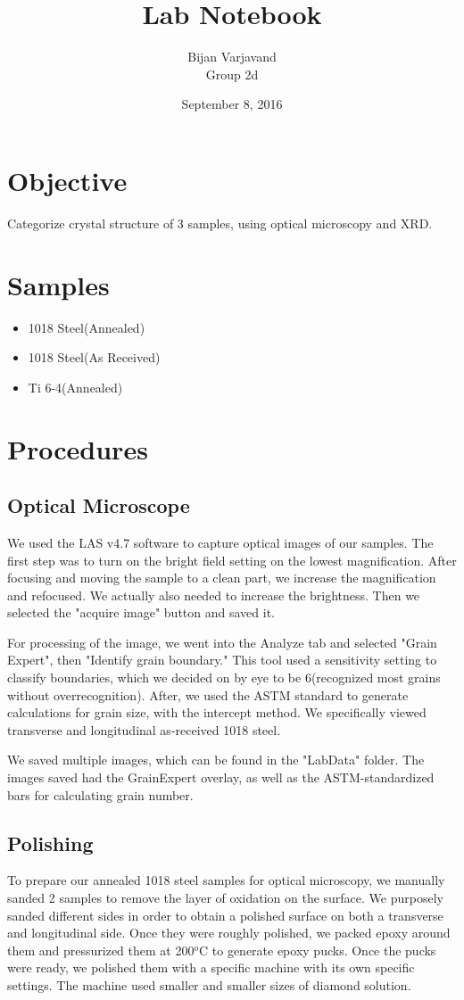 \documentclass{article}
\author{Bijan Varjavand\\Group 2d}
\title{Lab Notebook}
\date{September 8, 2016}
\begin{document}
\maketitle

\section{Objective}
Categorize crystal structure of 3 samples, using optical microscopy and XRD.

\section{Samples}
\begin{itemize}
 \item 1018 Steel(Annealed)
 \item 1018 Steel(As Received)
 \item Ti 6-4(Annealed)
\end{itemize}

\section{Procedures}

\subsection{Optical Microscope}
We used the LAS v4.7 software to capture optical images of our samples. The first step was to turn on the bright field setting on the lowest magnification. After focusing and moving the sample to a clean part, we increase the magnification and refocused. We actually also needed to increase the brightness. Then we selected the "acquire image" button and saved it.

For processing of the image, we went into the Analyze tab and selected "Grain Expert", then "Identify grain boundary." This tool used a sensitivity setting to classify boundaries, which we decided on by eye to be 6(recognized most grains without overrecognition). After, we used the ASTM standard to generate calculations for grain size, with the intercept method. We specifically viewed transverse and longitudinal as-received 1018 steel. 

We saved multiple images, which can be found in the "LabData" folder. The images saved had the GrainExpert overlay, as well as the ASTM-standardized bars for calculating grain number.

\subsection{Polishing}
To prepare our annealed 1018 steel samples for optical microscopy, we manually sanded 2 samples to remove the layer of oxidation on the surface. We purposely sanded different sides in order to obtain a polished surface on both a transverse and longitudinal side. Once they were roughly polished, we packed epoxy around them and pressurized them at 200$^o$C to generate epoxy pucks. Once the pucks were ready, we polished them with a specific machine with its own specific settings. The machine used smaller and smaller sizes of diamond solution.
\end{document}
